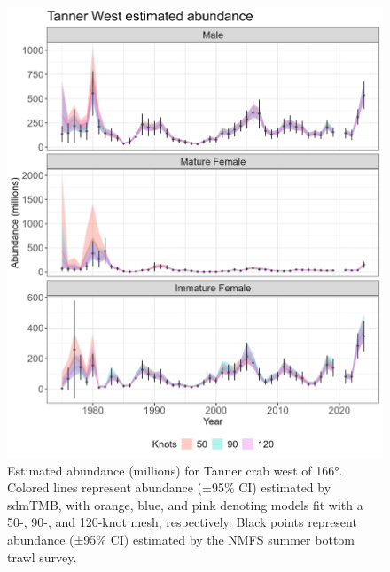 \documentclass[
]{article}
\begin{document}
\begin{figure}

{\centering \includegraphics[width=1\linewidth,height=1\textheight]{../BAIRDI/Figures/TannerWest.abundance.index} 

}

\caption{Estimated abundance (millions) for Tanner crab west of 166°. Colored lines represent abundance (±95\% CI) estimated by sdmTMB, with orange, blue, and pink denoting models fit with a 50-, 90-, and 120-knot mesh, respectively. Black points represent abundance (±95\% CI) estimated by the NMFS summer bottom trawl survey.}\label{fig:Westbairdi-abund-index}
\end{figure}
\end{document}
